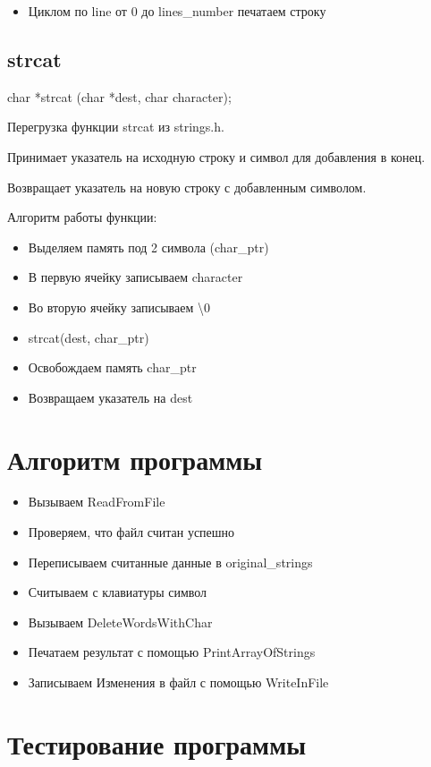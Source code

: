 \documentclass[12pt,a4paper]{article}  %
\begin{document}
	\begin{itemize}
		\item Циклом по line от 0 до lines\_number печатаем строку
	\end{itemize}
	
	\subsection*{strcat}
	char *strcat (char *dest, char character);
	
	Перегрузка функции strcat из strings.h.
	
	Принимает указатель на исходную строку и символ для добавления в конец.
	
	Возвращает указатель на новую строку с добавленным символом.
	
	Алгоритм работы функции:
	
	\begin{itemize}
		\item Выделяем память под 2 символа (char\_ptr)
		\item В первую ячейку записываем character
		\item Во вторую ячейку записываем \textbackslash 0
		\item strcat(dest, char\_ptr)
		\item Освобождаем память char\_ptr
		\item Возвращаем указатель на dest
	\end{itemize}

	\section*{Алгоритм программы}
	
	\begin{itemize}
		\item Вызываем ReadFromFile
		\item Проверяем, что файл считан успешно
		\item Переписываем считанные данные в original\_strings
		\item Считываем с клавиатуры символ
		\item Вызываем DeleteWordsWithChar
		\item Печатаем результат с помощью PrintArrayOfStrings
		\item Записываем Изменения в файл с помощью WriteInFile
	\end{itemize}
	
	\section*{Тестирование программы}
	
\end{document}
